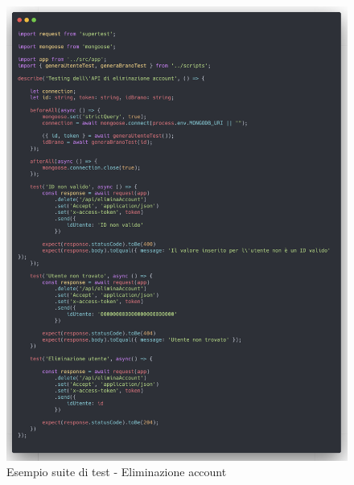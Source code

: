 \documentclass[a4paper,12pt]{article}
\begin{document}
\begin{figure}[htp]
    \centering
    \includegraphics[width=\textwidth]{source-code/test-elimina-account.png}
    \caption{Esempio suite di test - Eliminazione account}
\end{figure}
\end{document}
